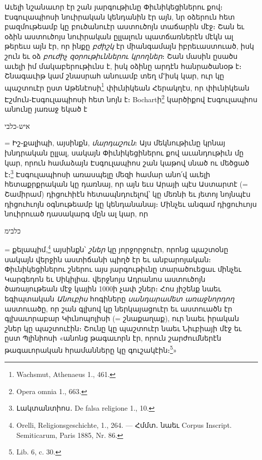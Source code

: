 \documentclass{article}
\begin{document}
{Աւելի նշանաւոր էր շան յարգութիւնը Փիւնիկեցիներու քով։ Էսգուլապիոսի նուիրական կենդանին էր այն, նր օձերուն հետ բազմութեամբ կը բուծանուէր աստուծոյն տաճարին մէջ։ Շան եւ օձին աստուծոյս նուիրական ըլլալուն պատճառներէն մէկն ալ թերեւս այն էր, որ ինքը \emph{բժիշկ} էր միանգամայն իբրեւաստուած, իսկ շուն եւ օձ \emph{բուժիչ զօրութիւններու կրողներ}։ Շան մասին ըսածս աւելի իմ մակաբերութիւնս է, իսկ օձինը արդէն հանրածանօթ է։ Շնագաւիթ կամ շնասրահ անուամբ տեղ մ՚իսկ կար, ուր կը պաշտուէր ըստ Աթենէոսի\footnote{Wachsmut, Athenaeus 1., 461.} փիւնիկեան Հերակղէս, որ փիւնիկեան Էշմուն֊Էսգուլապիոսի հետ նոյն է։ Bochartի\footnote{Opera omnia 1., 663.} կարծիքով Էսգուլապիոս անունը յառաջ եկած է \begin{hebrewfont}איש-כלבי\end{hebrewfont} = Իշ֊քալիպի, այսինքն, \emph{մարդաշուն}։ Այս մեկնութիւնը կրնայ խնդրական ըլլալ, սակայն Փիւնիկեցիներու քով աւանդութիւն մը կար, որուն համաձայն Էսգուլապիոս շան կաթով սնած ու մեծցած է։\footnote{Լակտանտիոս․ De falsa religione 1., 10.} Էսգուլապիոսի առասպելը մեզի համար անո՛վ աւելի հետաքրքրական կը դառնայ, որ այն եւս Արայի պէս Աստարտէ (= Շամիրամ) դիցուհիէն հետապնդուելով՝ կը մեռնի եւ յետոյ նոյնպէս դիցուհւոյն օգնութեամբ կը կենդանանայ։ Մինչեւ անգամ դիցուհւոյս նուիրուած դասակարգ մըն ալ կար, որ \begin{hebrewfont}כלבימ\end{hebrewfont} = քելապիմ,\footnote{Orelli, Religionsgeschichte, 1., 264. — Հմմտ․ նաեւ Corpus Inscript. Semiticarum, Paris 1885, Nr. 86.} այսինքն՝ \emph{շներ} կը յորջորջուէր, որոնց պաշտօնը սակայն վերջին աստիճանի պիղծ էր եւ անբարոյական։ Փիւնիկեցիներու շներու այս յարգութիւնը տարածուեցաւ մինչեւ Կարգեդոն եւ Սիկիլիա․ վերջնոյս Ադրանոս աստուծոյն ծառայութեան մէջ կային 1000ի չափ շներ։ Հոս յիշենք նաեւ եգիպտական \emph{Անուբիս} հոգիները \emph{սանդարամետ առաջնորդող} աստուածը, որ շան գլխով կը ներկայացուէր եւ աստուածն էր գլխաւորաբար Կիւնոպոլիսի (= շնաքաղաք), ուր նաեւ իրական շներ կը պաշտուէին։ Շունը կը պաշտուէր նաեւ Նիւբիայի մէջ եւ ըստ Պլինիոսի «անոնց թագաւորն էր, որուն շարժումներէն թագաւորական հրամանները կը գուշակէին։\footnote{Lib. 6, c. 30.}»

}
\end{document}
